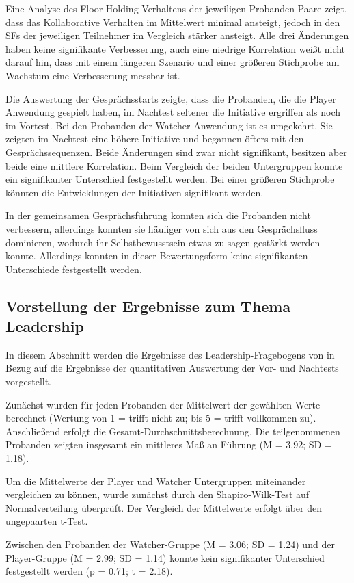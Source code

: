 Eine Analyse des Floor Holding Verhaltens der jeweiligen Probanden-Paare zeigt, dass das Kollaborative Verhalten im Mittelwert minimal ansteigt, jedoch in den \ac{SF}s der jeweiligen Teilnehmer im Vergleich stärker ansteigt. Alle drei Änderungen haben keine signifikante Verbesserung, auch eine niedrige Korrelation weißt nicht darauf hin, dass mit einem längeren Szenario und einer größeren Stichprobe am Wachstum eine Verbesserung messbar ist. 

Die Auswertung der Gesprächsstarts zeigte, dass die Probanden, die die Player Anwendung gespielt haben, im Nachtest seltener die Initiative ergriffen als noch im Vortest. Bei den Probanden der Watcher Anwendung ist es umgekehrt. Sie zeigten im Nachtest eine höhere Initiative und begannen öfters mit den Gesprächssequenzen. Beide Änderungen sind zwar nicht signifikant, besitzen aber beide eine mittlere Korrelation. Beim Vergleich der beiden Untergruppen konnte ein signifikanter Unterschied festgestellt werden. Bei einer größeren Stichprobe könnten die Entwicklungen der Initiativen signifikant werden.

In der gemeinsamen Gesprächsführung konnten sich die Probanden nicht verbessern, allerdings konnten sie häufiger von sich aus den Gesprächsfluss dominieren, wodurch ihr Selbstbewusstsein etwas zu sagen gestärkt werden konnte. Allerdings konnten in dieser Bewertungsform keine signifikanten Unterschiede festgestellt werden.


\subsection{Vorstellung der Ergebnisse zum Thema Leadership}
In diesem Abschnitt werden die Ergebnisse des Leadership-Fragebogens von \cite{emmerich_game_2016} in Bezug auf die Ergebnisse der quantitativen Auswertung der Vor- und Nachtests vorgestellt.

Zunächst wurden für jeden Probanden der Mittelwert der gewählten Werte berechnet (Wertung von 1 = trifft nicht zu; bis 5 = trifft vollkommen zu). Anschließend erfolgt die Gesamt-Durchschnittsberechnung. Die teilgenommenen Probanden zeigten insgesamt ein mittleres Maß an Führung (M = 3.92; SD = 1.18). 

Um die Mittelwerte der Player und Watcher Untergruppen miteinander vergleichen zu können, wurde zunächst durch den Shapiro-Wilk-Test auf Normalverteilung überprüft. Der Vergleich der Mittelwerte erfolgt über den ungepaarten t-Test.

Zwischen den Probanden der Watcher-Gruppe (M = 3.06; SD = 1.24) und der Player-Gruppe (M = 2.99; SD = 1.14) konnte kein signifikanter Unterschied festgestellt werden (p = 0.71; t = 2.18). 

